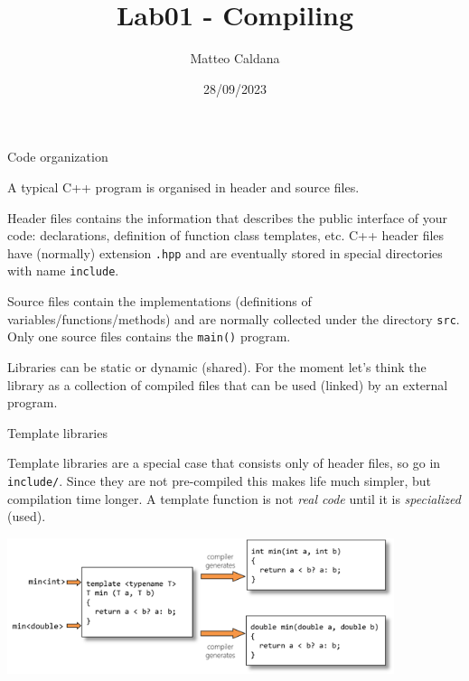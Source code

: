 \documentclass[12pt,aspectratio=169]{beamer}
\begin{document}
  \title{Lab01 - Compiling}
  \author{Matteo Caldana}
  \date{28/09/2023}
    
  \begin{frame}
    \maketitle
  \end{frame}

\begin{frame}{Code organization}

  A typical C++ program is organised in {\color{blue} header} and {\color{blue} source} files.  
  \smallskip

  \alert{Header files} contains the information that
  describes the public interface of your code: declarations,
  definition of function class templates, etc. 
  C++ header files have (normally) extension \texttt{.hpp} and are eventually stored in special directories with name \texttt{include}.
  \smallskip

  \alert{Source files} contain the implementations (definitions of variables/functions/methods) and are normally collected
  under the directory \texttt{src}. Only one source files contains the \texttt{main()} program.
  \smallskip

  {\color{blue} Libraries} can be static or dynamic (shared). For the moment let's think the library as a
  collection of compiled files that can be used (linked) by an external
  program. 
  \smallskip

  
\end{frame}

\begin{frame}{Template libraries}

  {\color{blue} Template libraries} are a special case that consists only of header files, so go in \texttt{include/}. Since they are not pre-compiled this makes life much simpler, but compilation time longer. A template function is not \textit{real code} until it is \textit{specialized} (used).

  \centerline{\includegraphics[width=0.85\textwidth]{template}}
   
\end{frame}
\end{document}
